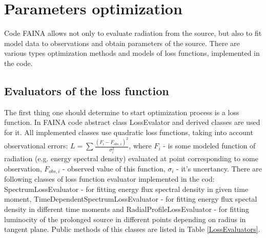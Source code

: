 \chapter{Parameters optimization}\label{optimization}
Code FAINA allows not only to evaluate radiation from the source, but also to fit model data to observations and obtain parameters of the source. There are various types optimization methods and models of loss functions, implemented in the code.

\section{Evaluators of the loss function}

The first thing one should determine to start optimization process is a loss function. In FAINA code abstract class LossEvalator and derived classes are used for it. All implemented classes use quadratic loss functions, taking into account observational errors:
$L = \sum \frac{(F_i - F_{obs,i})^2}{\sigma_i^2}$, where $F_i$ - is some modeled function of radiation (e.g. energy spectral density) evaluated at point corresponding to some observation, $F_{obs,i}$ - observed value of this function, $\sigma_i$ - it's uncertancy. There are following classes of loss function evaluator implemented in the cod: SpectrumLossEvaluator - for fitting energy flux spectral density in given time moment, TimeDependentSpectrumLossEvaluator - for fitting energy flux spectal density in different time moments and RadialProfileLossEvaluator - for fitting luminocity of the prolonged source in different points depending on radius in tangent plane. Public methods of this classes are listed in Table \ref{LossEvaluators}.


